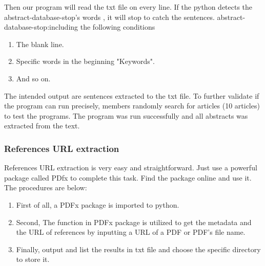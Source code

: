 
Then our program will read the txt file on every line.
If the python detects the abstract-database-stop's words ,
it will stop to catch the sentences.
abstract-database-stop:including the following conditions

\begin{enumerate}
	
	\item The blank line.
	\item Specific words in the beginning "Keywords".
	\item And so on.
	
\end{enumerate}

The intended output are sentences extracted to the txt file.
To further validate if the program can run precisely, members randomly search for articles (10 articles) to test the programs.
The program was run successfully and all abstracts was extracted from the text.

\subsubsection{References URL extraction}

References URL extraction is very easy and straightforward.
Just use a powerful package called PDfx to complete this task.
Find the package online and use it.
The procedures are below:

\begin{enumerate}
	
	\item First of all, a PDFx package is imported to python.
	\item Second, The function in PDFx package is utilized to get the metadata and the URL of references by inputting a URL of a PDF or PDF's file name.
	\item Finally, output and list the results in txt file and choose the specific directory to store it.
	
\end{enumerate}

